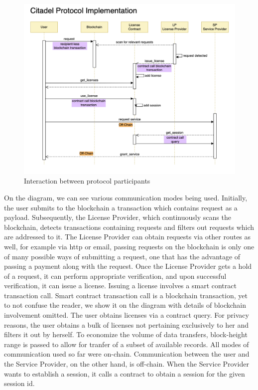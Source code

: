 \begin{figure}[h]
	\centering
		\includegraphics[width=390pt,draft=false]{images/implementation.png}
	\caption{Interaction between protocol participants}
	\label{fig:implementation}
\end{figure}

\begin{flushleft}
On the diagram, we can see various communication modes being used. Initially, the user submits to the blockchain a transaction which contains request as a payload. Subsequently, the License Provider, which continuously scans the blockchain, detects transactions containing requests and filters out requests which are addressed to it. The License Provider can obtain requests via other routes as well, for example via http or email, passing requests on the blockchain is only one of many possible ways of submitting a request, one that has the advantage of passing a payment along with the request. Once the License Provider gets a hold of a request, it can perform appropriate verification, and upon successful verification, it can issue a license. Issuing a license involves a smart contract transaction call. Smart contract transaction call is a blockchain transaction, yet to not confuse the reader, we show it on the diagram with details of blockchain involvement omitted. The user obtains licenses via a contract query. For privacy reasons, the user obtains a bulk of licenses not pertaining exclusively to her and filters it out by herself. To economize the volume of data transfers, block-height range is passed to allow for tranfer of a subset of available records. All modes of communication used so far were on-chain. Communication between the user and the Service Provider, on the other hand, is off-chain. When the Service Provider wants to establish a session, it calls a contract to obtain a session for the given session id.
\end{flushleft}

